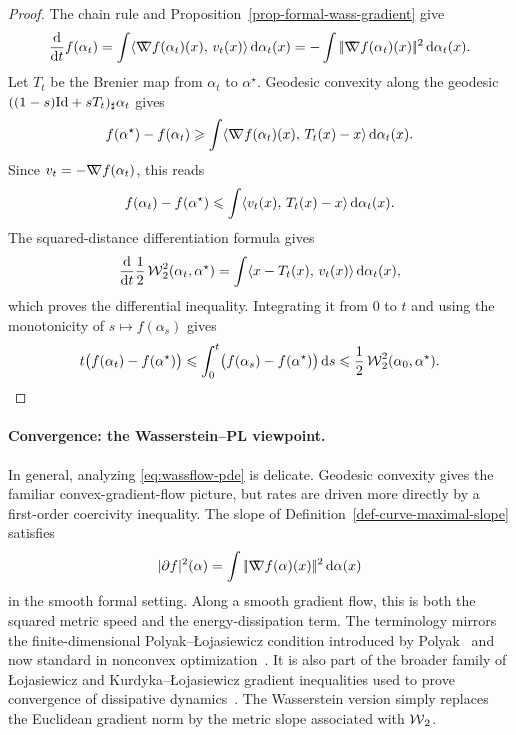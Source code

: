 \begin{proof}
	The chain rule and Proposition~\ref{prop-formal-wass-gradient} give
	\[
		\frac{\mathrm{d}}{\mathrm{d} t}f(\alpha_t)
		=
		\int \langle \mathord{\nabla\mkern-9.3mu\nabla} f(\alpha_t)(x),\,v_t(x)\rangle\,\mathrm{d}\alpha_t(x)
		=
		-\int |\!| \mathord{\nabla\mkern-9.3mu\nabla} f(\alpha_t)(x) |\!|^2\,\mathrm{d}\alpha_t(x).
	\]
	Let $T_t$ be the Brenier map from $\alpha_t$ to $\alpha^\star$. Geodesic convexity along the geodesic
	\(((1-s)\mathrm{Id}+sT_t)_\sharp\alpha_t\) gives
	\[
		f(\alpha^\star)-f(\alpha_t)
		\geqslant
		\int \langle \mathord{\nabla\mkern-9.3mu\nabla} f(\alpha_t)(x),\,T_t(x)-x\rangle\,\mathrm{d}\alpha_t(x).
	\]
	Since \(v_t=-\mathord{\nabla\mkern-9.3mu\nabla} f(\alpha_t)\), this reads
	\[
		f(\alpha_t)-f(\alpha^\star)
		\leqslant
		\int \langle v_t(x),\,T_t(x)-x\rangle\,\mathrm{d}\alpha_t(x).
	\]
	The squared-distance differentiation formula gives~\citep{ambrosio2006gradient}
	\[
		\frac{\mathrm{d}}{\mathrm{d} t}\frac12\operatorname{\mathcal{W}}_2^2(\alpha_t,\alpha^\star)
		=
		\int \langle x-T_t(x),\,v_t(x)\rangle\,\mathrm{d}\alpha_t(x),
	\]
	which proves the differential inequality. Integrating it from \(0\) to \(t\) and using the monotonicity of \(s\mapsto f(\alpha_s)\) gives
	\[
		t\bigl(f(\alpha_t)-f(\alpha^\star)\bigr)
		\leqslant
		\int_0^t \bigl(f(\alpha_s)-f(\alpha^\star)\bigr)\,\mathrm{d} s
		\leqslant
		\frac12\operatorname{\mathcal{W}}_2^2(\alpha_0,\alpha^\star).
	\]
\end{proof}


\paragraph{Convergence: the Wasserstein--PL viewpoint.}

In general, analyzing \eqref{eq:wassflow-pde} is delicate. Geodesic convexity gives the familiar convex-gradient-flow picture, but rates are driven more directly by a first-order coercivity inequality. The slope of Definition~\ref{def-curve-maximal-slope} satisfies
\[
	|\partial f|^2(\alpha)
	=
	\int|\!| \mathord{\nabla\mkern-9.3mu\nabla} f(\alpha)(x) |\!|^2\,\mathrm{d}\alpha(x)
\]
in the smooth formal setting. Along a smooth gradient flow, this is both the squared metric speed and the energy-dissipation term.
The terminology mirrors the finite-dimensional Polyak--{\L}ojasiewicz condition introduced by Polyak~\citep{Polyak1963GradientMethods} and now standard in nonconvex optimization~\citep{KarimiNutiniSchmidt2016PL}. It is also part of the broader family of {\L}ojasiewicz and Kurdyka--{\L}ojasiewicz gradient inequalities used to prove convergence of dissipative dynamics~\citep{attouch-2010,HauerMazon2019KLSMetric,DelloSchiavoMaasPedrotti2023LocalConditions}. The Wasserstein version simply replaces the Euclidean gradient norm by the metric slope associated with \(\operatorname{\mathcal{W}}_2\).

